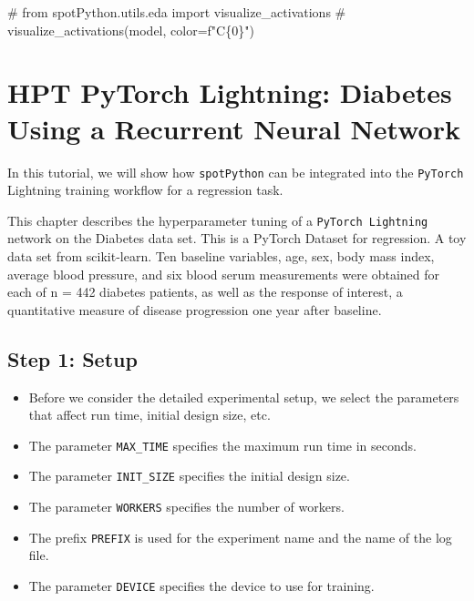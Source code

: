 \documentclass[
  letterpaper,
  DIV=11,
  numbers=noendperiod]{scrreprt}
\newenvironment{Shaded}{\begin{snugshade}}{\end{snugshade}}
\newcommand{\CommentTok}[1]{\textcolor[rgb]{0.37,0.37,0.37}{#1}}
\providecommand{\tightlist}{%
  \setlength{\itemsep}{0pt}\setlength{\parskip}{0pt}}\usepackage{longtable,booktabs,array}
\begin{document}
\begin{Shaded}
\begin{Highlighting}[]
\CommentTok{\# from spotPython.utils.eda import visualize\_activations}
\CommentTok{\# visualize\_activations(model, color=f"C\{0\}")}
\end{Highlighting}
\end{Shaded}

\chapter{HPT PyTorch Lightning: Diabetes Using a Recurrent Neural
Network}\label{hpt-pytorch-lightning-diabetes-using-a-recurrent-neural-network}

In this tutorial, we will show how \texttt{spotPython} can be integrated
into the \texttt{PyTorch} Lightning training workflow for a regression
task.

This chapter describes the hyperparameter tuning of a
\texttt{PyTorch\ Lightning} network on the Diabetes data set. This is a
PyTorch Dataset for regression. A toy data set from scikit-learn. Ten
baseline variables, age, sex, body mass index, average blood pressure,
and six blood serum measurements were obtained for each of n = 442
diabetes patients, as well as the response of interest, a quantitative
measure of disease progression one year after baseline.

\section{Step 1: Setup}\label{sec-setup-32}

\begin{itemize}
\tightlist
\item
  Before we consider the detailed experimental setup, we select the
  parameters that affect run time, initial design size, etc.
\item
  The parameter \texttt{MAX\_TIME} specifies the maximum run time in
  seconds.
\item
  The parameter \texttt{INIT\_SIZE} specifies the initial design size.
\item
  The parameter \texttt{WORKERS} specifies the number of workers.
\item
  The prefix \texttt{PREFIX} is used for the experiment name and the
  name of the log file.
\item
  The parameter \texttt{DEVICE} specifies the device to use for
  training.
\end{itemize}
\end{document}
